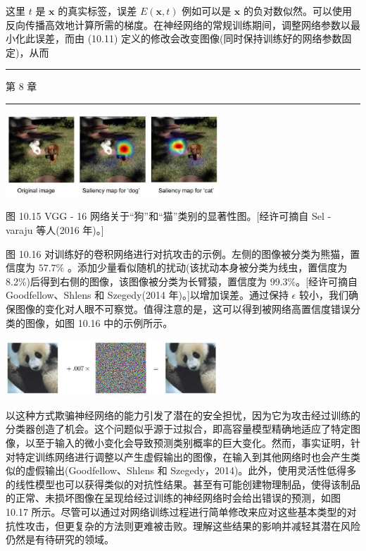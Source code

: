 \documentclass[10pt]{article}
\newcommand{\HRule}{\begin{center}\rule{0.9\linewidth}{0.2mm}\end{center}}
\begin{document}
这里 \(t\) 是 \(\mathbf{x}\) 的真实标签，误差 \(E\left( {\mathbf{x},t}\right)\) 例如可以是 \(\mathbf{x}\) 的负对数似然。可以使用反向传播高效地计算所需的梯度。在神经网络的常规训练期间，调整网络参数以最小化此误差，而由 (10.11) 定义的修改会改变图像(同时保持训练好的网络参数固定)，从而

\HRule

第 8 章

\HRule

\begin{center}
\includegraphics[max width=0.6\textwidth]{images/0194e279-9b28-703a-88f4-c3ac21e2010d_325_741_1700_812_314_0.jpg}
\end{center}
\hspace*{3em} 

图 10.15 VGG - 16 网络关于“狗”和“猫”类别的显著性图。[经许可摘自 Sel - varaju 等人(2016 年)。]

图 10.16 对训练好的卷积网络进行对抗攻击的示例。左侧的图像被分类为熊猫，置信度为 \({57.7}\%\) 。添加少量看似随机的扰动(该扰动本身被分类为线虫，置信度为 8.2\%)后得到右侧的图像，该图像被分类为长臂猿，置信度为 99.3\%。[经许可摘自 Goodfellow、Shlens 和 Szegedy(2014 年)。]以增加误差。通过保持 \(\epsilon\) 较小，我们确保图像的变化对人眼不可察觉。值得注意的是，这可以得到被网络高置信度错误分类的图像，如图 10.16 中的示例所示。

\begin{center}
\includegraphics[max width=0.6\textwidth]{images/0194e279-9b28-703a-88f4-c3ac21e2010d_326_677_397_862_225_0.jpg}
\end{center}
\hspace*{3em} 

以这种方式欺骗神经网络的能力引发了潜在的安全担忧，因为它为攻击经过训练的分类器创造了机会。这个问题似乎源于过拟合，即高容量模型精确地适应了特定图像，以至于输入的微小变化会导致预测类别概率的巨大变化。然而，事实证明，针对特定训练网络进行调整以产生虚假输出的图像，在输入到其他网络时也会产生类似的虚假输出(Goodfellow、Shlens 和 Szegedy，2014)。此外，使用灵活性低得多的线性模型也可以获得类似的对抗性结果。甚至有可能创建物理制品，使得该制品的正常、未损坏图像在呈现给经过训练的神经网络时会给出错误的预测，如图 10.17 所示。尽管可以通过对网络训练过程进行简单修改来应对这些基本类型的对抗性攻击，但更复杂的方法则更难被击败。理解这些结果的影响并减轻其潜在风险仍然是有待研究的领域。
\end{document}
